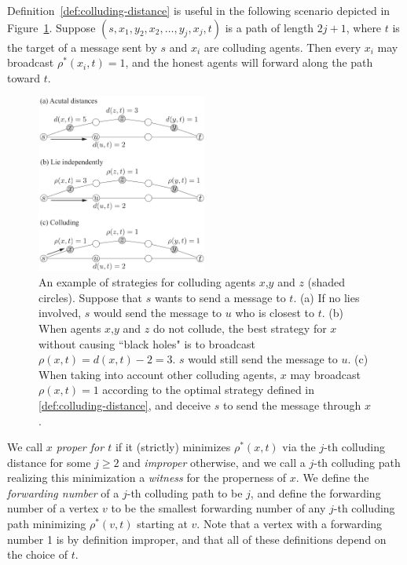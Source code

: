 \documentclass{comnet}
\begin{document}
Definition~\ref{def:colluding-distance} is useful in the following scenario
depicted in Figure~\ref{fig:colluding-distance}. Suppose $(s, x_1, y_2, x_2,
\dots, y_j, x_j, t)$ is a path of length $2j + 1$, where $t$ is the target of a
message sent by $s$ and $x_i$ are colluding agents.  Then every $x_i$ may
broadcast $\rho^*(x_i, t) = 1$, and 
the honest agents will forward along the path toward $t$.

\begin{figure}[thb]
\centering
\includegraphics[width=0.5\textwidth]{images/strategy.pdf}
\caption{An example of strategies for colluding agents $x$,$y$ and $z$ (shaded circles). Suppose that $s$ wants to send a message to $t$. (a) If no lies involved, $s$ would send the message to $u$ who is closest to $t$. (b) When agents $x$,$y$ and $z$ do not collude, the best strategy for $x$ without causing ``black holes" is to broadcast $\rho(x,t) = d(x,t) - 2=3$. $s$ would still send the message to $u$. (c) When taking into account other colluding agents, $x$ may broadcast $\rho(x,t) = 1$ according to the optimal strategy defined in \ref{def:colluding-distance}, and deceive $s$ to send the message through $x$.  }
\label{fig:colluding-distance}
\end{figure}

We call $x$ \emph{proper for $t$} if it (strictly) minimizes $\rho^*(x,t)$ via
the $j$-th colluding distance for some $j \geq 2$ and \emph{improper}
otherwise, and we call a $j$-th colluding path realizing this minimization a
\emph{witness} for the properness of $x$. We define the \emph{forwarding
number} of a $j$-th colluding path to be $j$, and define the forwarding number
of a vertex $v$ to be the smallest forwarding number of any $j$-th colluding
path minimizing $\rho^*(v,t)$ starting at $v$. Note that a vertex with a
forwarding number 1 is by definition improper, and that all of these
definitions depend on the choice of $t$.
\end{document}
